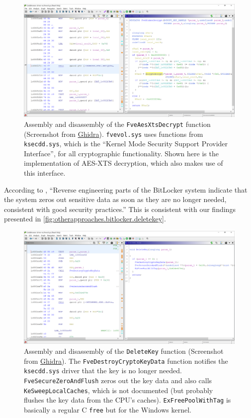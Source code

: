 \begin{figure}[htb!]
	\center
	\includegraphics[scale=0.39]{../img/otherapproaches.bitlocker.xtsdecrypt.png}
	\caption[
		Assembly and disassembly of the \texttt{FveAesXtsDecrypt} function
	]{
		Assembly and disassembly of the \texttt{FveAesXtsDecrypt} function (Screenshot from \href{https://www.ghidra-sre.org}{Ghidra}). \texttt{fvevol.sys} uses functions from \texttt{ksecdd.sys}, which is the ``Kernel Mode Security Support Provider Interface'', for all cryptographic functionality. Shown here is the implementation of AES-XTS decryption, which also makes use of this interface.
	}
	\label{fig:otherapproaches.bitlocker.xtsdecrypt}
\end{figure}

According to \cite{Kornblum2009}, ``Reverse engineering parts of the BitLocker system indicate that the system zeros out sensitive data as soon as they are no longer needed, consistent with good security practices.'' This is consistent with our findings presented in \autoref{fig:otherapproaches.bitlocker.deletekey}.

\begin{figure}[htb!]
	\center
	\includegraphics[scale=0.39]{../img/otherapproaches.bitlocker.deletekey.png}
	\caption[
		Assembly and disassembly of the \texttt{DeleteKey} function
	]{
		Assembly and disassembly of the \texttt{DeleteKey} function (Screenshot from \href{https://www.ghidra-sre.org}{Ghidra}). The \texttt{FveDestroyCryptoKeyData} function notifies the \texttt{ksecdd.sys} driver that the key is no longer needed. \texttt{FveSecureZeroAndFlush} zeros out the key data and also calls \texttt{KeSweepLocalCaches}, which is not documented (but probably flushes the key data from the CPU's caches). \texttt{ExFreePoolWithTag} is basically a regular C \texttt{free} but for the Windows kernel.
	}
	\label{fig:otherapproaches.bitlocker.deletekey}
\end{figure}